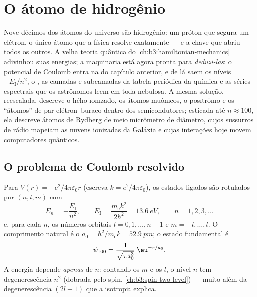 \chapter{O átomo de hidrogênio}\label{ch:b3:hydrogen-atom}

Nove décimos dos átomos do universo são hidrogênio: um próton que
segura um elétron, o único átomo que a física resolve exatamente --- e
a chave que abriu todos os outros. A velha teoria quântica do
\cref{ch:b3:hamiltonian-mechanics} adivinhou suas energias; a
maquinaria está agora pronta para \emph{deduzi-las}: o potencial de
Coulomb entra na  do capítulo anterior, e de lá saem os
níveis $-E_{\text{I}}/n^2$, o , as camadas e subcamadas da
tabela periódica da química e as séries espectrais que os astrônomos
leem em toda nebulosa. A mesma solução, reescalada, descreve o hélio
ionizado, os átomos muônicos, o positrônio e os ``átomos'' de par
elétron--buraco dentro dos semicondutores; esticada até $n
\approx 100$, ela descreve átomos de Rydberg de meio micrômetro de
diâmetro, cujos sussurros de rádio mapeiam as nuvens ionizadas da
Galáxia e cujas interações hoje movem computadores quânticos.

\section{O problema de Coulomb resolvido}

\begin{theorem}\label{thm:b3:hydrogen-atom:levels}
Para $V(r) = -e^2/4\pi\varepsilon_0 r$ (escreva $k = e^2/4\pi
\varepsilon_0$), os estados ligados são rotulados por $(n, l, m)$ com
\[
E_n = -\frac{E_{\text{I}}}{n^2} , \qquad
E_{\text{I}} = \frac{m_{\text{e}}k^2}{2\hbar^2} = \qty{13.6}{eV} ,
\qquad n = 1, 2, 3, \dots
\]
e, para cada $n$, os números orbitais $l = 0, 1, \dots, n-1$ e
$m = -l, \dots, l$. O comprimento natural é o  $a_0 =
\hbar^2/m_{\text{e}}k = \qty{52.9}{pm}$; o estado fundamental é
\[
\psi_{100} = \frac{1}{\sqrt{\pi a_0^3}}\;\eu^{-r/a_0} .
\]
A energia depende \emph{apenas} de $n$: contando os $m$ e os $l$, o
nível $n$ tem degenerescência $n^2$ (dobrada pelo spin,
\cref{ch:b3:spin-two-level}) --- muito além da degenerescência
$(2l+1)$ que a isotropia explica.
\end{theorem}

